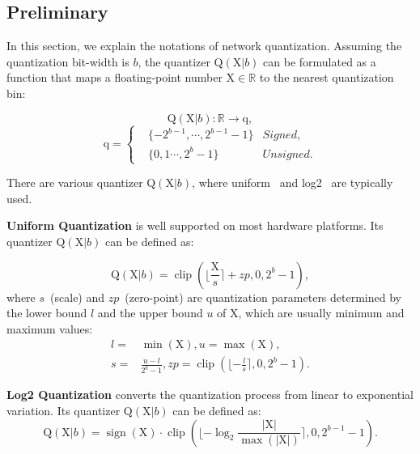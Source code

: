 \documentclass{article}
\begin{document}
\subsection{Preliminary}
\label{sec:method_pre}

In this section, we explain the notations of network quantization.
Assuming the quantization bit-width is $b$, the quantizer $\textrm{Q}(\textrm{X}|b)$ can be formulated as a function that maps a floating-point number $\textrm{X}\in \mathds{R}$ to the nearest quantization bin:

\begin{equation}
    \textrm{Q}(\textrm{X}|b): \mathds{R} \rightarrow \textrm{q},
\end{equation}
\begin{equation}
\textrm{q}=
\left\{\begin{aligned}
&\{-\textrm{2}^{b-1},\cdots ,\textrm{2}^{b-1}-\textrm{1}\} &Signed,\\
&\{\textrm{0}, \textrm{1} \cdots ,\textrm{2}^{b}-\textrm{1}\}  &Unsigned.
\end{aligned}\right.
\end{equation}

There are various quantizer $\textrm{Q}(\textrm{X}|b)$, where uniform~\cite{jacob2018quantization} and log2~\cite{cai2018deep} are typically used.

\textbf{Uniform Quantization} is well supported on most hardware platforms. Its quantizer $\textrm{Q}(\textrm{X}|b)$ can be defined as:

\begin{equation}
    \textrm{Q}(\textrm{X}|b)=\operatorname{clip}(\lfloor\frac{\textrm{X}}{s}\rceil+zp, \textrm{0}, \textrm{2}^{b}-\textrm{1}),
\end{equation}
where $s$~(scale) and $zp$~(zero-point) are quantization parameters determined by the lower bound $l$ and the upper bound $u$ of $\textrm{X}$, which are usually minimum and maximum values:
\begin{align}
l=&\min(\textrm{X}), u=\max(\textrm{X}),\\
    s=&\frac{u-l}{\textrm{2}^b-\textrm{1}},zp=\operatorname{clip}(\lfloor-\frac{l}{s}\rceil, \textrm{0}, \textrm{2}^{b}-\textrm{1}).
\end{align}


\textbf{Log2 Quantization} converts the quantization process from linear to exponential variation. Its quantizer $\textrm{Q}(\textrm{X}|b)$ can be defined as: 
\begin{equation}
    \textrm{Q}(\textrm{X}|b)=\operatorname{sign}(\textrm{X})\cdot \operatorname{clip}(\lfloor -\log_\textrm{2}\frac{|\textrm{X}|}{\max(|\textrm{X}|)}\rceil, \textrm{0},\textrm{2}^{b-1}-\textrm{1}).
    \label{equ:log2}
\end{equation}
\end{document}
